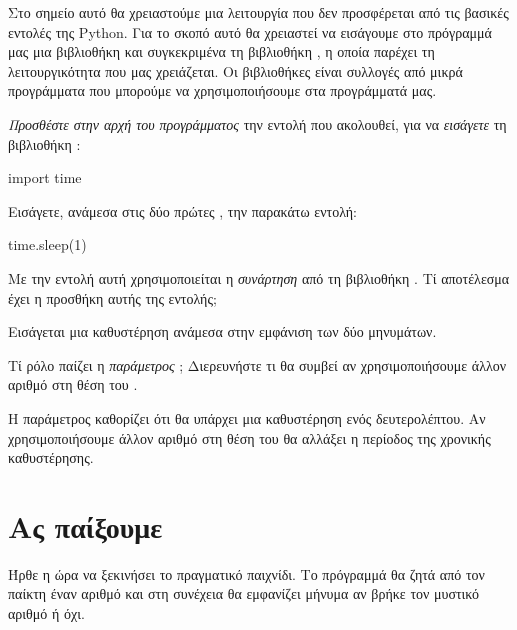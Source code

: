 \documentclass[a4paper,11pt,oneside]{book}
\begin{document}
Στο σημείο αυτό θα χρειαστούμε μια λειτουργία που δεν προσφέρεται από τις βασικές εντολές της Python. Για το σκοπό αυτό θα χρειαστεί να εισάγουμε στο πρόγραμμά μας μια βιβλιοθήκη και συγκεκριμένα τη βιβλιοθήκη , η οποία παρέχει τη λειτουργικότητα που μας χρειάζεται. Οι βιβλιοθήκες είναι συλλογές από μικρά προγράμματα που μπορούμε να χρησιμοποιήσουμε στα προγράμματά μας.

\begin{step}
\emph{Προσθέστε στην αρχή του προγράμματος} την εντολή που ακολουθεί, για να \emph{εισάγετε} τη βιβλιοθήκη :

\begin{pynew}
import time
\end{pynew}
\end{step}

\begin{step}
Εισάγετε, ανάμεσα στις δύο πρώτες , την παρακάτω εντολή:

\begin{pynew}
time.sleep(1)
\end{pynew}

Με την εντολή αυτή χρησιμοποιείται η \emph{συνάρτηση}  από τη βιβλιοθήκη . 
Τί αποτέλεσμα έχει η προσθήκη αυτής της εντολής;

\begin{answer}
	Εισάγεται μια καθυστέρηση ανάμεσα στην εμφάνιση των δύο μηνυμάτων.
\end{answer}

Tί ρόλο παίζει η \emph{παράμετρος} ; Διερευνήστε τι θα συμβεί αν χρησιμοποιήσουμε άλλον αριθμό στη θέση του .

\begin{answer}
Η παράμετρος  καθορίζει ότι θα υπάρχει μια καθυστέρηση ενός δευτερολέπτου. Αν χρησιμοποιήσουμε άλλον αριθμό στη θέση του  θα αλλάξει η περίοδος της χρονικής καθυστέρησης.
\end{answer}
\end{step}

\section{Ας παίξουμε}

Ήρθε η ώρα να ξεκινήσει το πραγματικό παιχνίδι. Το πρόγραμμά θα ζητά από τον παίκτη έναν αριθμό και στη συνέχεια θα εμφανίζει μήνυμα αν βρήκε τον μυστικό αριθμό ή όχι.
\end{document}
